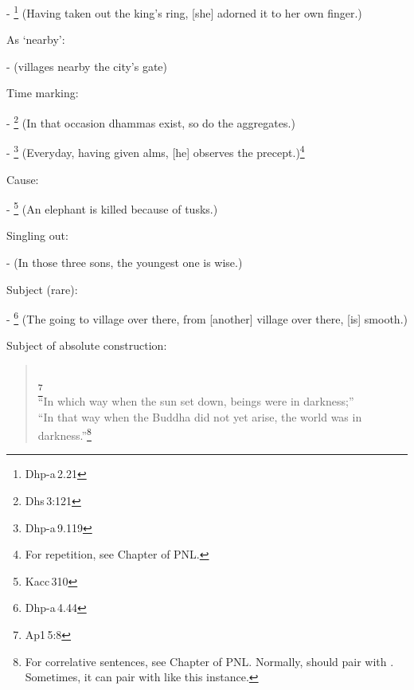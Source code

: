 \begin{compactenum}[(1)]
- \footnote{Dhp-a\,2.21} (Having taken out the king's ring, [she] adorned it to her own finger.)\par
\item As `nearby':\par
-  (villages nearby the city's gate)\par
\item Time marking:\par
- \footnote{Dhs\,3:121} (In that occasion dhammas exist, so do the aggregates.)\par
- \footnote{Dhp-a\,9.119} (Everyday, having given alms, [he] observes the precept.)\footnote{For repetition, see Chapter  of PNL.}\par
\item Cause:\par
- \footnote{Kacc\,310} (An elephant is killed because of tusks.)\par
\item Singling out:\par
-  (In those three sons, the youngest one is wise.)\par
\item Subject (rare):\par
- \footnote{Dhp-a\,4.44} (The going to village over there, from [another] village over there, [is] smooth.)\par
\item Subject of absolute construction:\par
\end{compactenum}

\begin{quote}
\\
\footnote{Ap1\,5:8}\\[1.5mm]
``In which way when the sun set down, beings were in darkness;''\\
``In that way when the Buddha did not yet arise, the world was in darkness.''\footnote{For correlative sentences, see Chapter  of PNL. Normally,  should pair with . Sometimes, it can pair with  like this instance.}
\end{quote}

